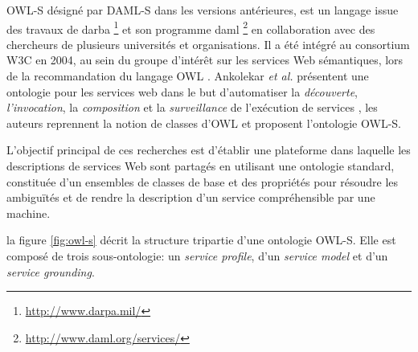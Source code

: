     \textsc{OWL-S} \cite{martin2004owl} désigné par \textsc{DAML-S}
    \cite{ankolekar2002daml} dans les versions antérieures, est un
    langage issue des travaux de \acrshort{darba}
    \footnote{\url{http://www.darpa.mil/}} et son programme
    \acrshort{daml} \footnote{\url{http://www.daml.org/services/}} en
    collaboration avec des chercheurs de plusieurs universités et
    organisations. Il a été intégré au consortium \textsc{W3C} en
    2004, au sein du groupe d'intérêt sur les services Web
    sémantiques, lors de la recommandation du langage \textsc{OWL}
    \cite{horrocks2002daml+oil, mcguinness2004owl}. Ankolekar \emph{et
      al.}  \cite{ankolekar2002daml} présentent une ontologie pour les
    services web dans le but d'automatiser la \emph{découverte},
    \emph{l'invocation}, la \emph{composition} et la
    \emph{surveillance} de l'exécution de services
    \cite{mcilraith2003bringing}, les auteurs reprennent la notion de
    classes d'\textsc{OWL} et proposent l'ontologie \textsc{OWL-S}.
    

    L'objectif principal de ces recherches est d'établir une
    plateforme dans laquelle les descriptions de services Web sont
    partagés en utilisant une ontologie standard, constituée d'un
    ensembles de classes de base et des propriétés pour résoudre les
    ambiguïtés et de rendre la description d'un service compréhensible
    par une machine.

    la figure \ref{fig:owl-s} décrit la structure tripartie d'une
    ontologie \textsc{OWL-S}. Elle est composé de trois
    sous-ontologie: un \emph{service profile}, d'un \emph{service
      model} et d'un \emph{service grounding}.

